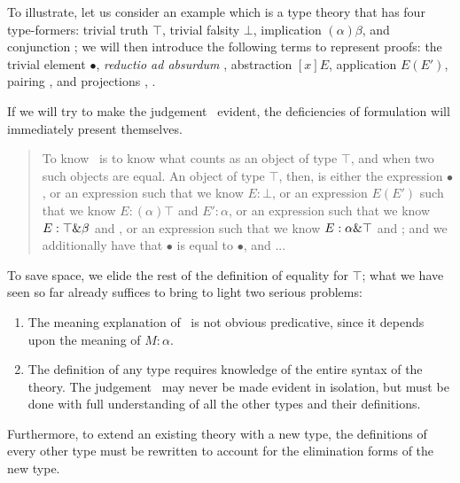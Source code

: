 \documentclass[main.tex]{subfiles}
\begin{document}
To illustrate, let us consider an example which is a type theory that has four
type-formers: trivial truth $\top$, trivial falsity $\bot$, implication
$(\alpha)\beta$, and conjunction \product\alpha\beta; we will then introduce the
following terms to represent proofs: the trivial element $\bullet$,
\emph{reductio ad absurdum} , abstraction $[x]E$, application
$E(E')$, pairing , and projections , .

If we will try to make the judgement \type\top\ evident, the deficiencies of
formulation will immediately present themselves.

\begin{quote}
To know \type\top\ is to know what counts as an object of type $\top$, and when
two such objects are equal. An object of type $\top$, then, is either the
expression $\bullet$, or an expression  such that we know
$E:\bot$, or an expression $E(E')$ such that we know $E:(\alpha)\top$ and
$E':\alpha$, or an expression  such that we know $E:\top\&\beta$
and \type\beta, or an expression  such that we know
$E:\alpha\&\top$ and \type\alpha; and we additionally have that $\bullet$
is equal to $\bullet$, and ...
\end{quote}

To save space, we elide the rest of the definition of equality for $\top$; what
we have seen so far already suffices to bring to light two serious problems:

\begin{enumerate}

  \item The meaning explanation of \type\alpha\ is not obvious predicative,
  since it depends upon the meaning of $M:\alpha$.

  \item The definition of any type requires knowledge of the entire syntax of
  the theory. The judgement \type\alpha\ may never be made evident in isolation,
  but must be done with full understanding of all the other types and their definitions.

\end{enumerate}

Furthermore, to extend an existing theory with a new type, the definitions of
every other type must be rewritten to account for the elimination forms of the
new type.
\end{document}

